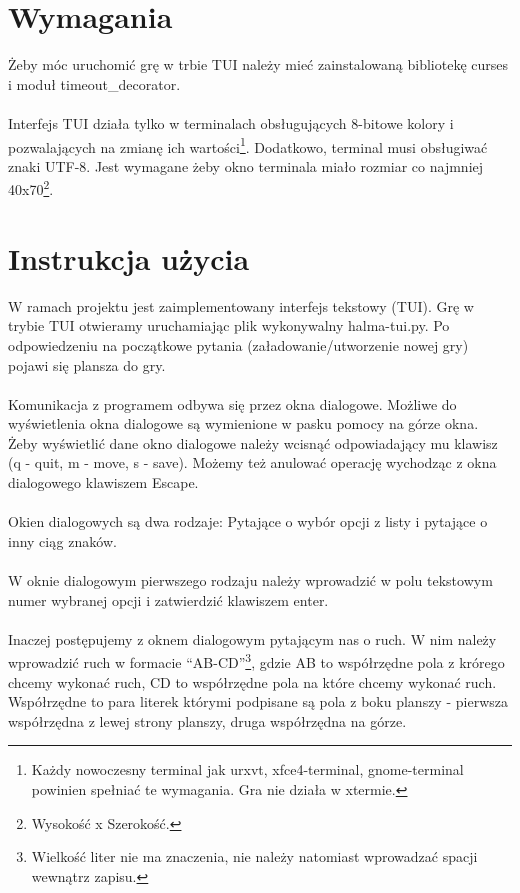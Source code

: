 \documentclass[12pt, titlepage]{article}
\begin{document}
\pagebreak
\section{Wymagania}
Żeby móc uruchomić grę w trbie TUI należy mieć zainstalowaną
bibliotekę curses i moduł timeout\_decorator.
\\~\\
Interfejs TUI działa tylko w terminalach obsługujących 8-bitowe
kolory i pozwalających na zmianę ich wartości\footnote{Każdy nowoczesny terminal jak urxvt, xfce4-terminal, gnome-terminal powinien spełniać te wymagania. Gra nie działa w xtermie.}.
Dodatkowo, terminal musi obsługiwać znaki UTF-8.
Jest wymagane żeby okno terminala miało rozmiar co
najmniej 40x70\footnote{Wysokość x Szerokość.}.

\section{Instrukcja użycia}
W ramach projektu jest zaimplementowany interfejs tekstowy (TUI).
Grę w trybie TUI otwieramy uruchamiając plik wykonywalny
halma-tui.py. Po odpowiedzeniu na początkowe pytania
(załadowanie/utworzenie nowej gry) pojawi się plansza do gry.
\\~\\
Komunikacja z programem odbywa się przez okna dialogowe.
Możliwe do wyświetlenia okna dialogowe są wymienione
w pasku pomocy na górze okna. Żeby wyświetlić dane okno
dialogowe należy wcisnąć odpowiadający mu klawisz (q - quit,
m - move, s - save). Możemy też anulować operację wychodząc
z okna dialogowego klawiszem Escape.
\\~\\
Okien dialogowych są dwa rodzaje: Pytające o wybór opcji z listy i
pytające o inny ciąg znaków.
\\~\\
W oknie dialogowym pierwszego rodzaju należy wprowadzić w
polu tekstowym numer wybranej opcji i zatwierdzić
klawiszem enter.
\\~\\
Inaczej postępujemy z oknem dialogowym pytającym nas o ruch.
W nim należy wprowadzić ruch w formacie "`AB-CD"'\footnote{Wielkość liter nie ma znaczenia, nie należy natomiast wprowadzać spacji wewnątrz zapisu.}, gdzie AB
to współrzędne pola z krórego chcemy wykonać ruch, CD to
współrzędne pola na które chcemy wykonać ruch. Współrzędne
to para literek którymi podpisane są pola z boku planszy -
pierwsza współrzędna z lewej strony planszy, druga współrzędna
na górze.
\end{document}
